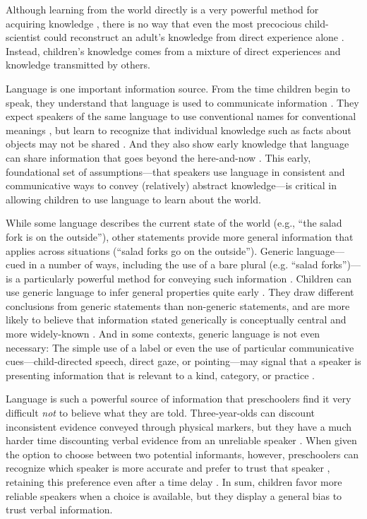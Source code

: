 \documentclass[man]{apa2}
\begin{document}
Although learning from the world directly is a very powerful method for acquiring knowledge \cite{gopnik2012b}, there is no way that even the most precocious child-scientist could reconstruct an adult's knowledge from direct experience alone \cite{shafto2012,harris2012}. Instead, children's knowledge comes from a mixture of direct experiences and knowledge transmitted by others. 

Language is one important information source. From the time children begin to speak, they understand that language is used to communicate information \cite{vouloumanos2012}. They expect speakers of the same language to use conventional names for conventional meanings \cite{clark1987, diesendruck2005}, but learn to recognize that individual knowledge such as facts about objects may not be shared \cite{diesendruck2001}. And they also show early knowledge that language can share information that goes beyond the here-and-now \cite{ganea2007}. This early, foundational set of assumptions---that speakers use language in consistent and communicative ways to convey (relatively) abstract knowledge---is critical in allowing children to use language to learn about the world. 

While some language describes the current state of the world (e.g., ``the salad fork is on the outside''), other statements provide more general information that applies across situations (``salad forks go on the outside''). Generic language---cued in a number of ways, including the use of a bare plural (e.g. ``salad forks'')---is a particularly powerful method for conveying such information \cite{leslie2008}. Children can use generic language to infer general properties quite early \cite{gelman2003}. They draw different conclusions from generic statements than non-generic statements, and are more likely to believe that information stated generically is conceptually central and more widely-known \cite{cimpian2009, cimpian2012}. And in some contexts, generic language is not even necessary: The simple use of a label or even the use of particular communicative cues---child-directed speech, direct gaze, or pointing---may signal that a speaker is presenting information that is relevant to a kind, category, or practice \cite{csibra2009, butler2012}. 

Language is such a powerful source of information that preschoolers find it very difficult \emph{not} to believe what they are told.  Three-year-olds can discount inconsistent evidence conveyed through physical markers, but they have a much harder time discounting verbal evidence from an unreliable speaker \cite{jaswal2010}.  When given the option to choose between two potential informants, however, preschoolers can recognize which speaker is more accurate and prefer to trust that speaker \cite{pasquini2007}, retaining this preference even after a time delay \cite{corriveau2009}.  In sum, children favor more reliable speakers when a choice is available, but they display a general bias to trust verbal information.
\end{document}
